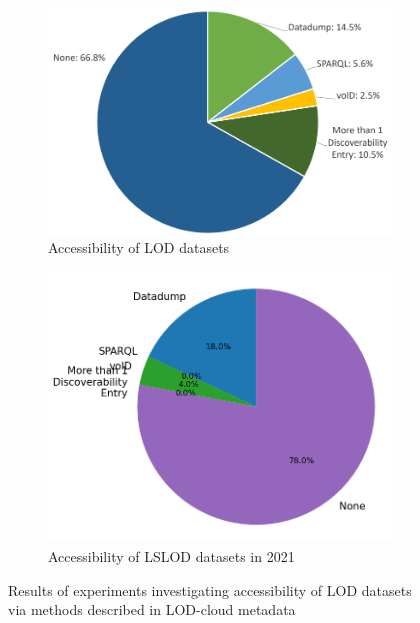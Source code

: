 \documentclass[runningheads]{llncs}
\begin{document}
    \begin{figure}[ht]
        \begin{subfigure}{0.545\textwidth}
            \centering
            \includegraphics[width=\linewidth]{figures/accessibility-2019}
            \caption{Accessibility of LOD datasets~\citep{debattista2019lod}}
            \label{fig:accessibility-2019}
        \end{subfigure}
        \begin{subfigure}{0.455\textwidth}
            \centering
            \includegraphics[width=\linewidth]{figures/accessibility-2021}
            \caption{Accessibility of LSLOD datasets in 2021}
            \label{fig:accessibility-2021}
        \end{subfigure}
        \caption{Results of experiments investigating accessibility of LOD datasets via methods described in LOD-cloud metadata}
        \label{fig:accessibility}
    \end{figure}
\end{document}
